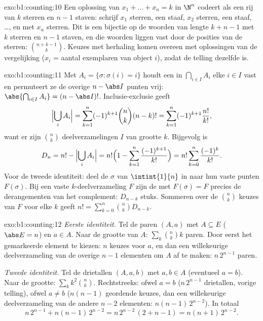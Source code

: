 \begin{solution}{exo:b1:counting:10}
Een oplossing van $x_1 + \dots + x_n = k$ in $\N^n$ codeert als een rij
van $k$ sterren en $n - 1$ staven: schrijf $x_1$ sterren, een staaf,
$x_2$ sterren, een staaf, \dots, en  met $x_n$ sterren. Dit is een
bijectie op de woorden van lengte $k + n - 1$ met $k$ sterren en $n - 1$
staven, en die woorden liggen vast door de posities van de sterren:
$\binom{n + k - 1}{k}$. Keuzes met herhaling komen overeen met
oplossingen van de vergelijking ($x_i$ = aantal exemplaren van object
$i$), zodat de telling dezelfde is.
\end{solution}

\begin{solution}{exo:b1:counting:11}
Met $A_i = \{\sigma : \sigma(i) = i\}$ houdt een  in
$\bigcap_{i \in I} A_i$ elke $i \in I$ vast en permuteert ze de overige
$n - \abs I$ punten vrij: $\abs{\bigcap_{i \in I} A_i} = (n - \abs I)!$.
Inclusie-exclusie geeft
\[
\Bigl|\bigcup_i A_i\Bigr|
= \sum_{k=1}^{n} (-1)^{k+1} \binom nk (n-k)!
= \sum_{k=1}^{n} (-1)^{k+1} \frac{n!}{k!} ,
\]
want er zijn $\binom nk$ deelverzamelingen $I$ van grootte $k$. Bijgevolg
is
\[
D_n = n! - \Bigl|\bigcup_i A_i\Bigr|
= n!\Bigl(1 - \sum_{k=1}^{n} \frac{(-1)^{k+1}}{k!}\Bigr)
= n! \sum_{k=0}^{n} \frac{(-1)^k}{k!} .
\]
Voor de tweede identiteit: deel de  $\sigma$ van
$\intint{1}{n}$ in naar hun  vaste punten $F(\sigma)$. Bij een
vaste $k$-deelverzameling $F$ zijn de  met $F(\sigma) = F$
precies de derangementen van het complement: $D_{n-k}$ stuks. Sommeren
over de $\binom nk$ keuzes van $F$ voor elke $k$ geeft $n! =
\sum_{k=0}^{n} \binom nk D_{n-k}$.
\end{solution}

\begin{solution}{exo:b1:counting:12}
\emph{Eerste identiteit.} Tel de paren $(A, a)$ met $A \subseteq E$
($\abs E = n$) en $a \in A$. Naar de grootte van $A$: $\sum_k \binom nk
k$ paren. Door eerst het gemarkeerde element te kiezen: $n$ keuzes voor
$a$, en dan een willekeurige deelverzameling van de overige $n - 1$
elementen om $A$ af te maken: $n\,2^{n-1}$ paren.

\emph{Tweede identiteit.} Tel de drietallen $(A, a, b)$ met $a, b \in A$
(eventueel $a = b$). Naar de grootte: $\sum_k k^2 \binom nk$.
Rechtstreeks: ofwel $a = b$ ($n\,2^{n-1}$ drietallen, vorige telling),
ofwel $a \neq b$ ($n(n-1)$ geordende keuzes, dan een willekeurige
deelverzameling van de andere $n - 2$ elementen: $n(n-1)\,2^{n-2}$). In
totaal
\[
n\,2^{n-1} + n(n-1)\,2^{n-2} = n\,2^{n-2}\,(2 + n - 1)
= n(n+1)\,2^{n-2} .
\]
\end{solution}

